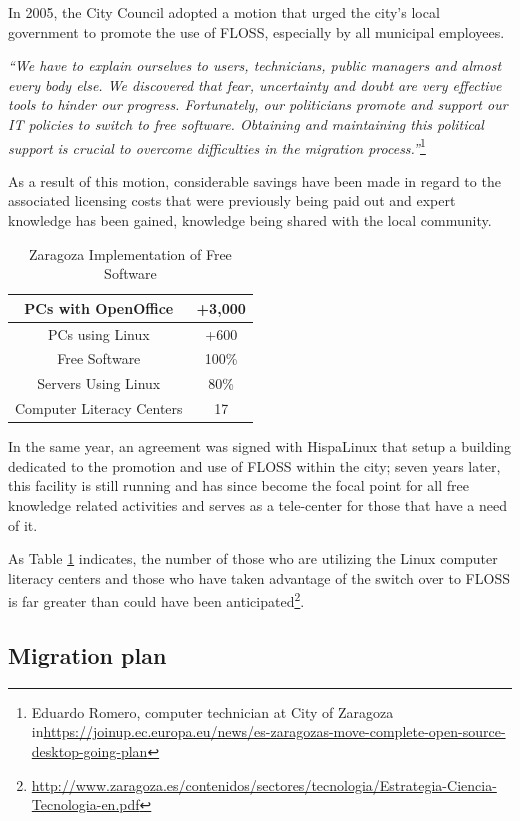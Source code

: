 In 2005, the City Council adopted a motion that urged the city’s local government to promote the use of  FLOSS, especially by all municipal employees. 

\textit{``We have to explain ourselves to users, technicians, public managers and almost every body else. We discovered that fear, uncertainty and doubt are very effective tools to hinder our progress. Fortunately, our politicians promote and support our IT policies to switch to free software. Obtaining and maintaining this political support is crucial to overcome difficulties in the migration process.''}\footnote{Eduardo Romero, computer technician at City of Zaragoza in\url{https://joinup.ec.europa.eu/news/es-zaragozas-move-complete-open-source-desktop-going-plan}}

As a result of this motion, considerable savings have been made in regard to the associated licensing costs that were previously being paid out and expert knowledge has been gained, knowledge being shared with the local community. 
\begin{table}[H] \centering

\begin{tabular}{| c| c |}
\hline
PCs with OpenOffice & +3,000\\\hline
PCs using Linux   & +600  \\ \hline
Free Software      & 100\%  \\ \hline
Servers Using Linux  & 80\% \\ \hline
Computer Literacy Centers & 17   \\
\hline
\end{tabular}
\caption{Zaragoza Implementation of Free Software}
\label{table:Zaragoza implementation}
\end{table}
In the same year, an agreement was signed with HispaLinux that setup a building dedicated to the promotion and use of   FLOSS within the city; seven years later, this facility is still running and has since become the focal point for all free knowledge related activities and serves as a tele-center for those that have a need of it.

As Table \ref{table:Zaragoza implementation} indicates, the number of those who are utilizing the Linux computer literacy centers and those who have taken advantage of the switch over to FLOSS is far greater than could have been anticipated\footnote{\url{http://www.zaragoza.es/contenidos/sectores/tecnologia/Estrategia-Ciencia-Tecnologia-en.pdf}}.


\subsection{Migration plan}

